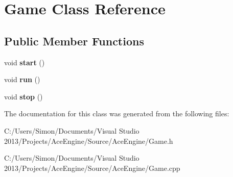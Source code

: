 \hypertarget{class_game}{}\section{Game Class Reference}
\label{class_game}
\subsection*{Public Member Functions}
\begin{DoxyCompactItemize}
\item 
\hypertarget{class_game_a3d9b98f7c4a96ecf578f75b96c9f0e90}{}void {\bfseries start} ()\label{class_game_a3d9b98f7c4a96ecf578f75b96c9f0e90}

\item 
\hypertarget{class_game_a1ab78f5ed0d5ea879157357cf2fb2afa}{}void {\bfseries run} ()\label{class_game_a1ab78f5ed0d5ea879157357cf2fb2afa}

\item 
\hypertarget{class_game_a17fbb36fd4a2085f9ff4f1fa93d7d08b}{}void {\bfseries stop} ()\label{class_game_a17fbb36fd4a2085f9ff4f1fa93d7d08b}

\end{DoxyCompactItemize}


The documentation for this class was generated from the following files\+:\begin{DoxyCompactItemize}
\item 
C\+:/\+Users/\+Simon/\+Documents/\+Visual Studio 2013/\+Projects/\+Ace\+Engine/\+Source/\+Ace\+Engine/Game.\+h\item 
C\+:/\+Users/\+Simon/\+Documents/\+Visual Studio 2013/\+Projects/\+Ace\+Engine/\+Source/\+Ace\+Engine/Game.\+cpp\end{DoxyCompactItemize}
